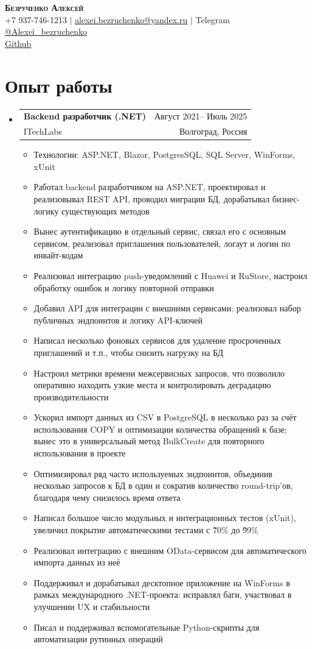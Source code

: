 \documentclass[A4,11pt]{article}
\makeatletter
\newcommand{\CVItem}[1]{
  \item\small{
    {#1 \vspace{-2pt}}
  }
}
\newcommand{\CVSubheading}[4]{
  \vspace{-2pt}\item
    \begin{tabular*}{0.97\textwidth}[t]{l@{\extracolsep{\fill}}r}
      \textbf{#1} & #2 \\
      \small#3 & \small #4 \\
    \end{tabular*}\vspace{-7pt}
}
\newcommand{\CVSubHeadingListStart}{\begin{itemize}[leftmargin=0.5cm, label={}]}
\newcommand{\CVSubHeadingListEnd}{\end{itemize}}
\newcommand{\CVItemListStart}{\begin{itemize}}
\newcommand{\CVItemListEnd}{\end{itemize}\vspace{-5pt}}
\makeatother
\begin{document}


\begin{center}
   \textbf{\Huge \scshape Безрученко Алексей} \\ \vspace{1pt} 
   \small +7 937-746-1213 $|$ 
   \href{mailto:alexei.bezruchenko@yandex.ru}{\underline{alexei.bezruchenko@yandex.ru}} $|$ 
   Telegram \href{https://t.me/Alexei_bezruchenko}{\underline{@Alexei\_bezruchenko}} \\
   \href{https://github.com/a-bezruchenko}{\underline{Github}}
\end{center}


\section{Опыт работы}
  \CVSubHeadingListStart
    \CVSubheading
      {Backend разработчик (.NET)}{Август 2021-- Июль 2025}
      {ITechLabs}{Волгоград, Россия}
    \CVItemListStart
      \CVItem{Технологии: ASP.NET, Blazor, PostgresSQL, SQL Server, WinForms, xUnit}
      \CVItem{Работал backend разработчиком на ASP.NET, проектировал и реализовывал REST API, проводил миграции БД, дорабатывал бизнес-логику существующих методов}
      \CVItem{Вынес аутентификацию в отдельный сервис, связал его с основным сервисом, реализовал приглашения пользователей, логаут и логин по инвайт-кодам}
      \CVItem{Реализовал интеграцию push-уведомлений с Huawei и RuStore, настроил обработку ошибок и логику повторной отправки}
      \CVItem{Добавил API для интеграции с внешними сервисами: реализовал набор публичных эндпоинтов и логику API-ключей}
      \CVItem{Написал несколько фоновых сервисов для удаление просроченных приглашений и т.п., чтобы снизить нагрузку на БД}
      \CVItem{Настроил метрики времени межсервисных запросов, что позволило оперативно находить узкие места и контролировать деградацию производительности}
      \CVItem{Ускорил импорт данных из CSV в PostgreSQL в несколько раз за счёт использования COPY и оптимизации количества обращений к базе; вынес это в универсальный метод BulkCreate для повторного использования в проекте}
      \CVItem{Оптимизировал ряд часто используемых эндпоинтов, объединив несколько запросов к БД в один и сократив количество round-trip’ов, благодаря чему снизилось время ответа}
      \CVItem{Написал большое число модульных и интеграционных тестов (xUnit), увеличил покрытие автоматическими тестами с \~70\% до \~99\%}
      \CVItem{Реализовал интеграцию с внешним OData-сервисом для автоматического импорта данных из неё}
      \CVItem{Поддерживал и дорабатывал десктопное приложение на WinForms в рамках международного .NET-проекта: исправлял баги, участвовал в улучшении UX и стабильности}
      \CVItem{Писал и поддерживал вспомогательные Python-скрипты для автоматизации рутинных операций}
    \CVItemListEnd
  \CVSubHeadingListEnd
\end{document}
